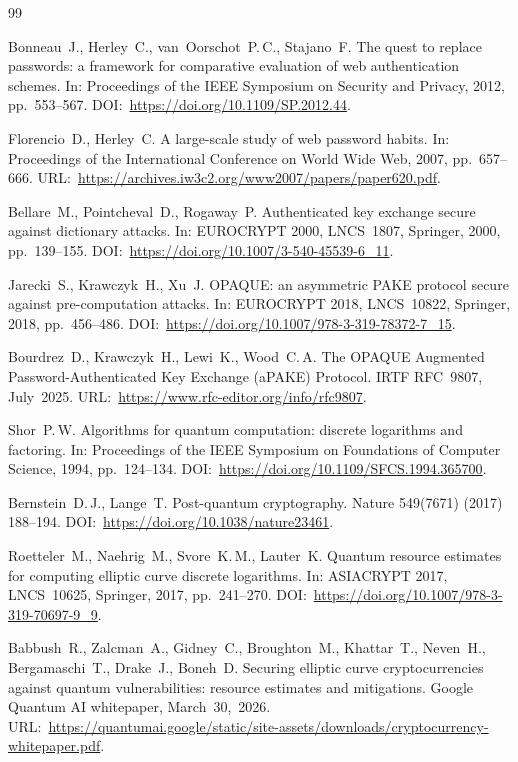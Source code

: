 \documentclass{ieeeijc}
\theoremstyle{remark}
\begin{document}
\begin{thebibliography}{99}

Bonneau~J., Herley~C., van~Oorschot~P.\,C., Stajano~F.
The quest to replace passwords: a framework for comparative evaluation of web authentication schemes.
In: Proceedings of the IEEE Symposium on Security and Privacy, 2012, pp.~553--567.
DOI:~\url{https://doi.org/10.1109/SP.2012.44}.

Florencio~D., Herley~C.
A large-scale study of web password habits.
In: Proceedings of the International Conference on World Wide Web, 2007, pp.~657--666.
URL:~\url{https://archives.iw3c2.org/www2007/papers/paper620.pdf}.

Bellare~M., Pointcheval~D., Rogaway~P.
Authenticated key exchange secure against dictionary attacks.
In: EUROCRYPT 2000, LNCS~1807, Springer, 2000, pp.~139--155.
DOI:~\url{https://doi.org/10.1007/3-540-45539-6_11}.

Jarecki~S., Krawczyk~H., Xu~J.
OPAQUE: an asymmetric PAKE protocol secure against pre-computation attacks.
In: EUROCRYPT 2018, LNCS~10822, Springer, 2018, pp.~456--486.
DOI:~\url{https://doi.org/10.1007/978-3-319-78372-7_15}.

Bourdrez~D., Krawczyk~H., Lewi~K., Wood~C.\,A.
The OPAQUE Augmented Password-Authenticated Key Exchange (aPAKE) Protocol.
IRTF RFC~9807, July~2025.
URL:~\url{https://www.rfc-editor.org/info/rfc9807}.

Shor~P.\,W.
Algorithms for quantum computation: discrete logarithms and factoring.
In: Proceedings of the IEEE Symposium on Foundations of Computer Science, 1994, pp.~124--134.
DOI:~\url{https://doi.org/10.1109/SFCS.1994.365700}.

Bernstein~D.\,J., Lange~T.
Post-quantum cryptography.
Nature 549(7671) (2017) 188--194.
DOI:~\url{https://doi.org/10.1038/nature23461}.

Roetteler~M., Naehrig~M., Svore~K.\,M., Lauter~K.
Quantum resource estimates for computing elliptic curve discrete logarithms.
In: ASIACRYPT 2017, LNCS~10625, Springer, 2017, pp.~241--270.
DOI:~\url{https://doi.org/10.1007/978-3-319-70697-9_9}.

Babbush~R., Zalcman~A., Gidney~C., Broughton~M., Khattar~T.,
Neven~H., Bergamaschi~T., Drake~J., Boneh~D.
Securing elliptic curve cryptocurrencies against quantum vulnerabilities:
resource estimates and mitigations.
Google Quantum AI whitepaper, March~30,~2026.
URL:~\url{https://quantumai.google/static/site-assets/downloads/cryptocurrency-whitepaper.pdf}.


\end{thebibliography}
\end{document}
